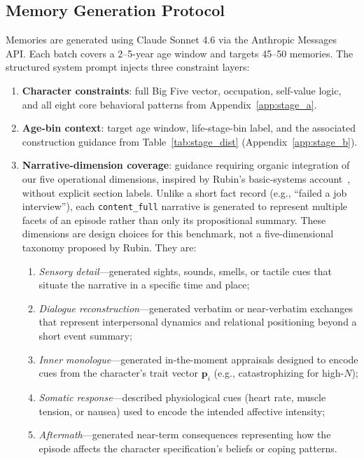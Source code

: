 \documentclass[11pt]{article}
\begin{document}
\subsection{Memory Generation Protocol}
\label{app:stage_c}

Memories are generated using Claude Sonnet 4.6 via the Anthropic Messages API. Each batch covers a 2--5-year age window and targets 45--50 memories. The structured system prompt injects three constraint layers:

\begin{enumerate}[leftmargin=1.5em, itemsep=2pt]
  \item \textbf{Character constraints}: full Big Five vector, occupation, self-value logic, and all eight core behavioral patterns from Appendix~\ref{app:stage_a}.
  \item \textbf{Age-bin context}: target age window, life-stage-bin label, and the associated construction guidance from Table~\ref{tab:stage_dist} (Appendix~\ref{app:stage_b}).
  \item \textbf{Narrative-dimension coverage}: guidance requiring organic integration of our five operational dimensions, inspired by Rubin's basic-systems account~\cite{rubin2006basic}, without explicit section labels.
  Unlike a short fact record (e.g., ``failed a job interview''), each \texttt{content\_full} narrative is generated to represent multiple facets of an episode rather than only its propositional summary.
  These dimensions are design choices for this benchmark, not a five-dimensional taxonomy proposed by Rubin. They are:
  \begin{enumerate}[leftmargin=1.5em, itemsep=1pt]
    \item \textit{Sensory detail}---generated sights, sounds, smells, or tactile cues that situate the narrative in a specific time and place;
    \item \textit{Dialogue reconstruction}---generated verbatim or near-verbatim exchanges that represent interpersonal dynamics and relational positioning beyond a short event summary;
    \item \textit{Inner monologue}---generated in-the-moment appraisals designed to encode cues from the character's trait vector $\mathbf{p}_i$ (e.g., catastrophizing for high-$N$);
    \item \textit{Somatic response}---described physiological cues (heart rate, muscle tension, or nausea) used to encode the intended affective intensity;
    \item \textit{Aftermath}---generated near-term consequences representing how the episode affects the character specification's beliefs or coping patterns.
  \end{enumerate}
\end{enumerate}
\end{document}
